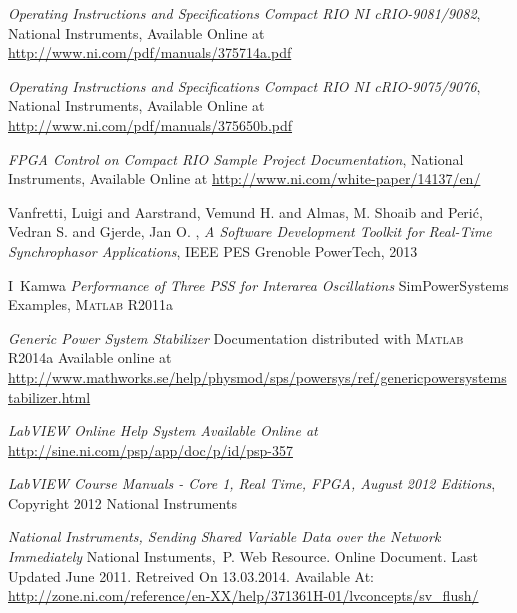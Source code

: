 \documentclass[journal]{IEEEtran}
\begin{document}
\begin{thebibliography}{1}
 \emph{Operating Instructions and Specifications Compact RIO NI cRIO-9081/9082}, National Instruments, Available Online at \url{http://www.ni.com/pdf/manuals/375714a.pdf}
  
 \emph{Operating Instructions and Specifications Compact RIO NI cRIO-9075/9076}, National Instruments, Available Online at \url{http://www.ni.com/pdf/manuals/375650b.pdf}

 \emph{FPGA Control on Compact RIO Sample Project Documentation}, National Instruments, Available Online at \url{http://www.ni.com/white-paper/14137/en/}

 Vanfretti, Luigi and Aarstrand, Vemund H. and Almas, M. Shoaib and Peri\'c, Vedran S. and Gjerde, Jan O. , \emph{A Software Development Toolkit for Real-Time Synchrophasor Applications},  IEEE PES Grenoble PowerTech, 2013

 I~Kamwa \emph{Performance of Three PSS for Interarea Oscillations} SimPowerSystems Examples, \textsc{Matlab} R2011a

 \emph{Generic Power System Stabilizer} Documentation distributed with \textsc{Matlab} R2014a Available online at \url{http://www.mathworks.se/help/physmod/sps/powersys/ref/genericpowersystemstabilizer.html}

 \emph{LabVIEW Online Help System Available Online at} \url{http://sine.ni.com/psp/app/doc/p/id/psp-357}

 \emph{LabVIEW Course Manuals - Core 1, Real Time, FPGA, August 2012 Editions}, Copyright 2012 National Instruments

 \emph{National Instruments, Sending Shared Variable Data over the Network Immediately} National Instuments,\ P. Web Resource. Online Document. Last Updated June 2011.
  Retreived On 13.03.2014. Available At:  \url{http://zone.ni.com/reference/en-XX/help/371361H-01/lvconcepts/sv_flush/}    

\end{thebibliography}

% 
\end{document}
